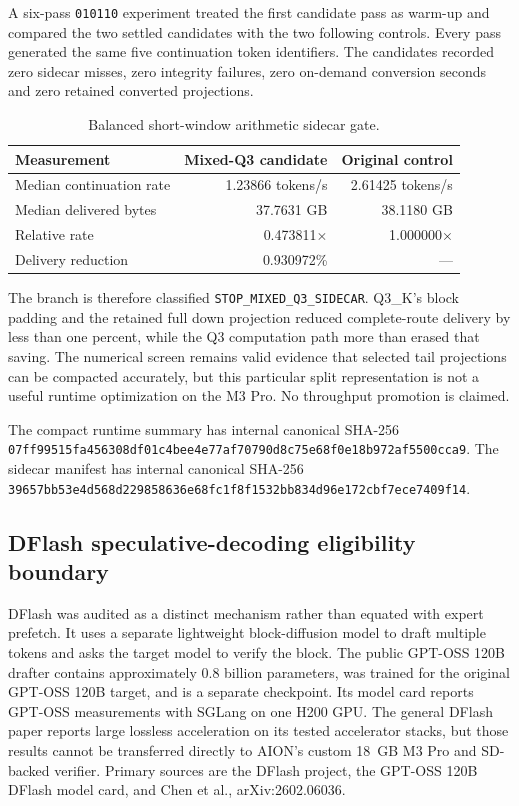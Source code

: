 A six-pass \texttt{010110} experiment treated the first candidate pass as
warm-up and compared the two settled candidates with the two following
controls.  Every pass generated the same five continuation token identifiers.
The candidates recorded zero sidecar misses, zero integrity failures, zero
on-demand conversion seconds and zero retained converted projections.

\begin{table}[ht]
\centering
\begin{tabular}{lrr}
\toprule
Measurement & Mixed-Q3 candidate & Original control \\
\midrule
Median continuation rate & 1.23866 tokens/s & 2.61425 tokens/s \\
Median delivered bytes & 37.7631 GB & 38.1180 GB \\
Relative rate & 0.473811$\times$ & 1.000000$\times$ \\
Delivery reduction & 0.930972\% & --- \\
\bottomrule
\end{tabular}
\caption{Balanced short-window arithmetic sidecar gate.}
\end{table}

The branch is therefore classified \texttt{STOP\_MIXED\_Q3\_SIDECAR}.  Q3\_K's
block padding and the retained full down projection reduced complete-route
delivery by less than one percent, while the Q3 computation path more than
erased that saving.  The numerical screen remains valid evidence that selected
tail projections can be compacted accurately, but this particular split
representation is not a useful runtime optimization on the M3 Pro.  No
throughput promotion is claimed.

The compact runtime summary has internal canonical SHA-256
\texttt{07ff99515fa456308df01c4bee4e77af70790d8c75e68f0e18b972af5500cca9}.
The sidecar manifest has internal canonical SHA-256
\texttt{39657bb53e4d568d229858636e68fc1f8f1532bb834d96e172cbf7ece7409f14}.

\subsection{DFlash speculative-decoding eligibility boundary}

DFlash was audited as a distinct mechanism rather than equated with expert
prefetch.  It uses a separate lightweight block-diffusion model to draft
multiple tokens and asks the target model to verify the block.  The public
GPT-OSS 120B drafter contains approximately 0.8 billion parameters, was trained
for the original GPT-OSS 120B target, and is a separate checkpoint.  Its model
card reports GPT-OSS measurements with SGLang on one H200 GPU.  The general
DFlash paper reports large lossless acceleration on its tested accelerator
stacks, but those results cannot be transferred directly to AION's custom
18~GB M3 Pro and SD-backed verifier.  Primary sources are the DFlash project,
the GPT-OSS 120B DFlash model card, and Chen et al., arXiv:2602.06036.

